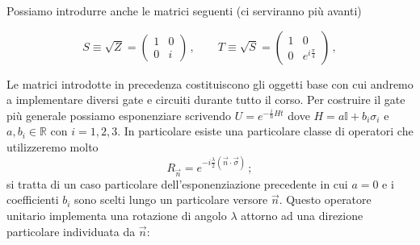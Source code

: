 \noindent Possiamo introdurre anche le matrici seguenti (ci serviranno più avanti)

\begin{equation}\label{S_T_matrices}
    S \equiv \sqrt{Z} =
\begin{pmatrix}
    1 & 0 \\ 0 & i
\end{pmatrix} \, , \qquad 
T \equiv \sqrt{S} =
\begin{pmatrix}
    1 & 0 \\ 0 & e^{i \frac{\pi}{4}}
\end{pmatrix} \, ,
\end{equation}

\noindent Le matrici introdotte in precedenza costituiscono gli oggetti base con cui andremo a implementare diversi gate e circuiti durante tutto il corso. Per costruire il gate più generale possiamo esponenziare scrivendo $U = e^{-\frac{i}{\hbar} H t}$ dove $H = a \mathbb{I} + b_i \sigma_i$ e $a, b_i \in \mathbb{R}$ con $i = 1,2,3$. In particolare esiste una particolare classe di operatori che utilizzeremo molto
\begin{equation*}
    R_{\vec{n}} = e^{-i \frac{\lambda}{2} (\vec n \cdot \vec \sigma)} \, ;
\end{equation*}
si tratta di un caso particolare dell'esponenziazione precedente in cui $a = 0$ e i coefficienti $b_i$ sono scelti lungo un particolare versore $\vec n$. Questo operatore unitario implementa una rotazione di angolo $\lambda$ attorno ad una direzione particolare individuata da $\vec n$:

